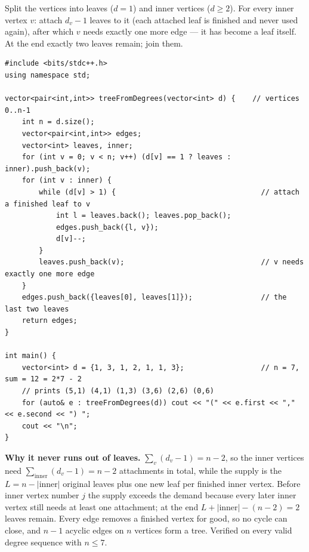 \begin{solutionbox}
Split the vertices into leaves ($d = 1$) and inner vertices ($d \ge 2$). For every inner vertex $v$: attach $d_v - 1$ leaves to it (each attached leaf is finished and never used again), after which $v$ needs exactly one more edge --- it has become a leaf itself. At the end exactly two leaves remain; join them.
\begin{lstlisting}[style=cpp]
#include <bits/stdc++.h>
using namespace std;

vector<pair<int,int>> treeFromDegrees(vector<int> d) {    // vertices 0..n-1
    int n = d.size();
    vector<pair<int,int>> edges;
    vector<int> leaves, inner;
    for (int v = 0; v < n; v++) (d[v] == 1 ? leaves : inner).push_back(v);
    for (int v : inner) {
        while (d[v] > 1) {                                  // attach a finished leaf to v
            int l = leaves.back(); leaves.pop_back();
            edges.push_back({l, v});
            d[v]--;
        }
        leaves.push_back(v);                                // v needs exactly one more edge
    }
    edges.push_back({leaves[0], leaves[1]});                // the last two leaves
    return edges;
}

int main() {
    vector<int> d = {1, 3, 1, 2, 1, 1, 3};                  // n = 7, sum = 12 = 2*7 - 2
    // prints (5,1) (4,1) (1,3) (3,6) (2,6) (0,6)
    for (auto& e : treeFromDegrees(d)) cout << "(" << e.first << "," << e.second << ") ";
    cout << "\n";
}
\end{lstlisting}
\begin{center}
\end{center}
\textbf{Why it never runs out of leaves.} $\sum_v (d_v - 1) = n - 2$, so the inner vertices need $\sum_{\text{inner}} (d_v - 1) = n - 2$ attachments in total, while the supply is the $L = n - |\text{inner}|$ original leaves plus one new leaf per finished inner vertex. Before inner vertex number $j$ the supply exceeds the demand because every later inner vertex still needs at least one attachment; at the end $L + |\text{inner}| - (n - 2) = 2$ leaves remain. Every edge removes a finished vertex for good, so no cycle can close, and $n - 1$ acyclic edges on $n$ vertices form a tree. Verified on every valid degree sequence with $n \le 7$.
\end{solutionbox}
